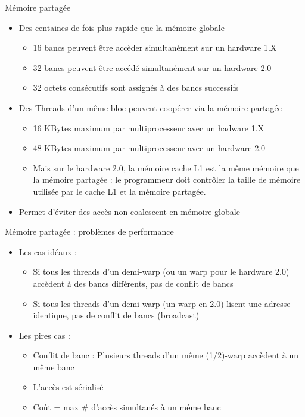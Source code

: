 \documentclass{beamer}
\begin{document}
\begin{frame}{Mémoire partagée}

\begin{itemize}
\item Des centaines de fois plus rapide que la mémoire globale
  \begin{itemize}
  \item 16 bancs peuvent être accèder simultanément sur
    un hardware 1.X
  \item 32 bancs peuvent être accédé simultanément sur un hardware 2.0
  \item 32 octets consécutifs sont assignés à des bancs successifs
  \end{itemize}
\item Des Threads d'un même bloc peuvent coopérer via la mémoire partagée
  \begin{itemize}
  \item 16 KBytes maximum par multiprocesseur avec un hadware 1.X 
  \item 48 KBytes maximum par multiprocesseur avec un hardware 2.0
  \item Mais sur le hardware 2.0, la mémoire cache L1 est la même mémoire que
    la mémoire partagée : le programmeur doit contrôler la taille de mémoire utilisée
    par le cache L1 et la mémoire partagée.
  \end{itemize}
\item Permet d'éviter des accès non coalescent en mémoire globale  
\end{itemize}
\end{frame}

\begin{frame}{Mémoire partagée : problèmes de performance }

\begin{itemize}
\item Les cas idéaux :
  \begin{itemize}
  \item Si tous les threads d'un demi-warp (ou un warp pour le hardware 2.0)
    accèdent à des bancs différents, pas de conflit de bancs
  \item Si tous les threads d'un demi-warp (un warp en 2.0) lisent une adresse
    identique, pas de conflit de bancs (broadcast)
  \end{itemize}
\item Les pires cas :
  \begin{itemize}
  \item Conflit de banc  : Plusieurs threads d'un même (1/2)-warp accèdent à un même banc
  \item L'accès est sérialisé
  \item Coût = max \# d'accès simultanés à un même banc
  \end{itemize}
\end{itemize}
\end{frame}
\end{document}
